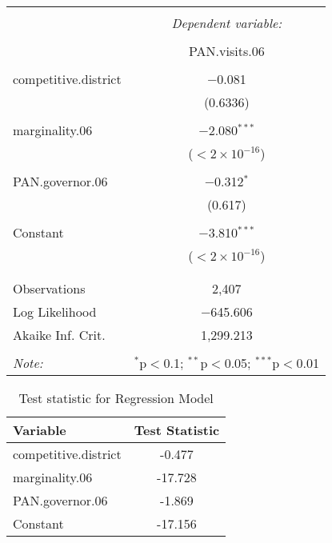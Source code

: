 \documentclass[12pt,letterpaper]{article}
\begin{document}
\begin{enumerate}
\begin{table}[!htbp] \centering 
	\caption{} 
	\label{} 
	\begin{tabular}{@{\extracolsep{5pt}}lc} 
		\\[-1.8ex]\hline 
		\hline \\[-1.8ex] 
		& \multicolumn{1}{c}{\textit{Dependent variable:}} \\ 
		\cline{2-2} 
		\\[-1.8ex] & PAN.visits.06 \\ 
		\hline \\[-1.8ex] 
		competitive.district & $-$0.081 \\ 
		& (0.6336) \\ 
		& \\ 
		marginality.06 & $-$2.080$^{***}$ \\ 
		& ($<2\times10^{-16}$) \\ 
		& \\ 
		PAN.governor.06 & $-$0.312$^{*}$ \\ 
		& (0.617) \\ 
		& \\ 
		Constant & $-$3.810$^{***}$ \\ 
		& ($<2\times10^{-16}$) \\ 
		& \\ 
		\hline \\[-1.8ex] 
		Observations & 2,407 \\ 
		Log Likelihood & $-$645.606 \\ 
		Akaike Inf. Crit. & 1,299.213 \\ 
		\hline 
		\hline \\[-1.8ex] 
		\textit{Note:}  & \multicolumn{1}{r}{$^{*}$p$<$0.1; $^{**}$p$<$0.05; $^{***}$p$<$0.01} \\ 
	\end{tabular} 
\end{table} 

\begin{table}[htbp]
	\centering
	\begin{tabular}{lc}
		\hline
		Variable & Test Statistic \\
		\hline
		competitive.district & -0.477 \\
		marginality.06 & -17.728 \\
		PAN.governor.06 & -1.869 \\
		Constant & -17.156 \\
		\hline
	\end{tabular}
	\caption{Test statistic for Regression Model}
	\label{tab:t-scores}
\end{table}




\end{enumerate}
\end{document}
